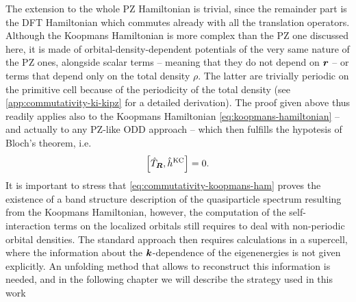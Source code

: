 The extension to the whole PZ Hamiltonian is trivial, since the remainder part is the DFT Hamiltonian which commutes already with all the translation operators. Although the Koopmans Hamiltonian is more complex than the PZ one discussed here, it is made of orbital-density-dependent potentials of the very same nature of the PZ ones, alongside scalar terms -- meaning that they do not depend on ${\bm r}$ -- or terms that depend only on the total density $\rho$. The latter are trivially periodic on the primitive cell because of the periodicity of the total density (see \cref{app:commutativity-ki-kipz} for a detailed derivation). The proof given above thus readily applies also to the Koopmans Hamiltonian \eqref{eq:koopmans-hamiltonian} -- and actually to any PZ-like ODD approach -- which then fulfills the hypotesis of Bloch's theorem, i.e.
%
\begin{equation}
    \left[ \hat{T}_{{\bm R}}, \hat{h}^{\rm KC} \right] = 0 .
    \label{eq:commutativity-koopmans-ham}
\end{equation}
%
It is important to stress that \cref{eq:commutativity-koopmans-ham} proves the existence of a band structure description of the quasiparticle spectrum resulting from the Koopmans Hamiltonian, however, the computation of the self-interaction terms on the localized orbitals still requires to deal with non-periodic orbital densities. The standard approach then requires calculations in a supercell, where the information about the ${\bm k}$-dependence of the eigenenergies is not given explicitly. An unfolding method that allows to reconstruct this information is needed, and in the following chapter we will describe the strategy used in this work

